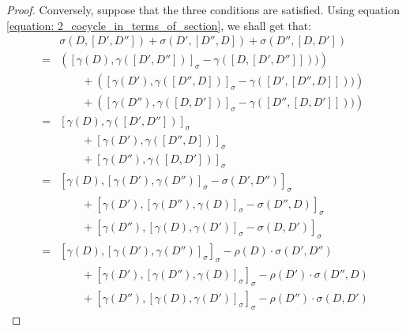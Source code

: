 \begin{proof}
                Conversely, suppose that the three conditions are satisfied. Using equation \eqref{equation: 2_cocycle_in_terms_of_section}, we shall get that:
                    $$
                        \begin{aligned}
                            & \sigma( D, [D', D''] ) + \sigma( D', [D'', D] ) + \sigma( D'', [D, D'] )
                            \\
                            = &
                                \left( [ \gamma(D), \gamma([D', D'']) ]_{\sigma} - \gamma( [D, [D', D'']] )) \right)
                                \\
                                & \qquad + \left( [ \gamma(D'), \gamma([D'', D]) ]_{\sigma} - \gamma( [D', [D'', D]] )) \right)
                                \\
                                & \qquad + \left( [ \gamma(D''), \gamma([D, D']) ]_{\sigma} - \gamma( [D'', [D, D']] )) \right)
                            \\
                            = &
                                [ \gamma(D), \gamma([D', D'']) ]_{\sigma} 
                                \\
                                & \qquad + [ \gamma(D'), \gamma([D'', D]) ]_{\sigma}
                                \\
                                & \qquad + [ \gamma(D''), \gamma([D, D']) ]_{\sigma}
                            \\
                            = &
                                [ \gamma(D), [\gamma(D'), \gamma(D'')]_{\sigma} - \sigma(D', D'') ]_{\sigma}
                                \\
                                & \qquad + [ \gamma(D'), [\gamma(D''), \gamma(D)]_{\sigma} - \sigma(D'', D) ]_{\sigma}
                                \\
                                & \qquad + [ \gamma(D''), [\gamma(D), \gamma(D')]_{\sigma} - \sigma(D, D') ]_{\sigma}
                            \\
                            = &
                                [ \gamma(D), [\gamma(D'), \gamma(D'')]_{\sigma} ]_{\sigma} - \rho(D) \cdot \sigma(D', D'')
                                \\
                                & \qquad + [ \gamma(D'), [\gamma(D''), \gamma(D)]_{\sigma} ]_{\sigma} - \rho(D') \cdot \sigma(D'', D)
                                \\
                                & \qquad + [ \gamma(D''), [\gamma(D), \gamma(D')]_{\sigma} ]_{\sigma} - \rho(D'') \cdot \sigma(D, D')

\end{aligned}$$
\end{proof}
